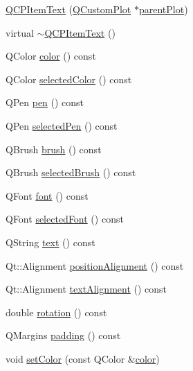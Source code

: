 \begin{DoxyCompactItemize}
\item 
\hyperlink{class_q_c_p_item_text_a77ff96a2972a00872ff8f8c67143abbe}{Q\-C\-P\-Item\-Text} (\hyperlink{class_q_custom_plot}{Q\-Custom\-Plot} $\ast$\hyperlink{class_q_c_p_layerable_ab7e0e94461566093d36ffc0f5312b109}{parent\-Plot})
\item 
virtual \hyperlink{class_q_c_p_item_text_a1efd41ca53d49042d4f4b63cf9615cb6}{$\sim$\-Q\-C\-P\-Item\-Text} ()
\item 
Q\-Color \hyperlink{class_q_c_p_item_text_ac9cb0a8a27f64d1b40855910ea9ebd03}{color} () const 
\item 
Q\-Color \hyperlink{class_q_c_p_item_text_a44f690ec0ba6a32e518f2e923c002e39}{selected\-Color} () const 
\item 
Q\-Pen \hyperlink{class_q_c_p_item_text_a552bd02f46dbcb4b4812559036893352}{pen} () const 
\item 
Q\-Pen \hyperlink{class_q_c_p_item_text_a70c86ec95133d3e904d1718023fe3c4e}{selected\-Pen} () const 
\item 
Q\-Brush \hyperlink{class_q_c_p_item_text_a38b981dfacb703efa8e27346eebcb5a2}{brush} () const 
\item 
Q\-Brush \hyperlink{class_q_c_p_item_text_ac6802bbceff1ade0053166c64a5a6966}{selected\-Brush} () const 
\item 
Q\-Font \hyperlink{class_q_c_p_item_text_ad34943fd68a9b1451d3e3234d072e418}{font} () const 
\item 
Q\-Font \hyperlink{class_q_c_p_item_text_af2e7cacb1975132508714a51c5f48c3b}{selected\-Font} () const 
\item 
Q\-String \hyperlink{class_q_c_p_item_text_a9547f7832010486abed0837e75db5330}{text} () const 
\item 
Qt\-::\-Alignment \hyperlink{class_q_c_p_item_text_af13c6adc480f268116ae72196eb44b06}{position\-Alignment} () const 
\item 
Qt\-::\-Alignment \hyperlink{class_q_c_p_item_text_aaa1d84b3f61f9f2a0cce230e66ef7194}{text\-Alignment} () const 
\item 
double \hyperlink{class_q_c_p_item_text_ae8991207fa1697511c1c8af9f3ca0e0a}{rotation} () const 
\item 
Q\-Margins \hyperlink{class_q_c_p_item_text_a00e0fa03822ff384bf4921c1c90322ff}{padding} () const 
\item 
void \hyperlink{class_q_c_p_item_text_aa51efc0841fe52da9eaf8aff6fc8a8b2}{set\-Color} (const Q\-Color \&\hyperlink{class_q_c_p_item_text_ac9cb0a8a27f64d1b40855910ea9ebd03}{color})

\end{DoxyCompactItemize}
